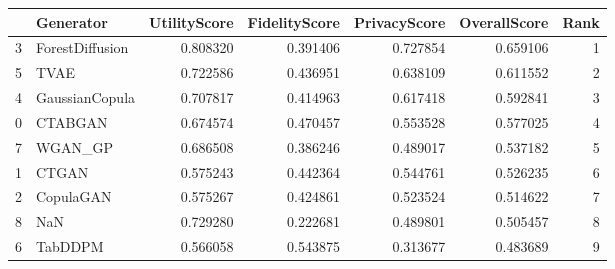 \begin{tabular}{llrrrrr}
\toprule
 & Generator & UtilityScore & FidelityScore & PrivacyScore & OverallScore & Rank \\
\midrule
3 & ForestDiffusion & 0.808320 & 0.391406 & 0.727854 & 0.659106 & 1 \\
5 & TVAE & 0.722586 & 0.436951 & 0.638109 & 0.611552 & 2 \\
4 & GaussianCopula & 0.707817 & 0.414963 & 0.617418 & 0.592841 & 3 \\
0 & CTABGAN & 0.674574 & 0.470457 & 0.553528 & 0.577025 & 4 \\
7 & WGAN_GP & 0.686508 & 0.386246 & 0.489017 & 0.537182 & 5 \\
1 & CTGAN & 0.575243 & 0.442364 & 0.544761 & 0.526235 & 6 \\
2 & CopulaGAN & 0.575267 & 0.424861 & 0.523524 & 0.514622 & 7 \\
8 & NaN & 0.729280 & 0.222681 & 0.489801 & 0.505457 & 8 \\
6 & TabDDPM & 0.566058 & 0.543875 & 0.313677 & 0.483689 & 9 \\
\bottomrule
\end{tabular}
